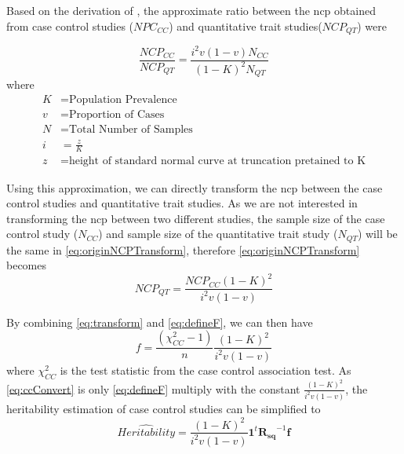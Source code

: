 			Based on the derivation of \citet{Yang2010}, the approximate ratio between the \gls{ncp} obtained from case control studies ($NPC_{CC}$) and quantitative trait studies($NCP_{QT}$) were
		
			\begin{equation}
			\frac{NCP_{CC}}{NCP_{QT}} = \frac{i^2v(1-v)N_{CC}}{(1-K)^2N_{QT}}
			\label{eq:originNCPTransform}
			\end{equation}
			where
			\begin{align*}
			 K &= \text{Population Prevalence} \\
			 v &= \text{Proportion of Cases}\\
			 N &= \text{Total Number of Samples}\\
			 i &= \frac{z}{K}\\
			 z &= \text{height of standard normal curve at truncation pretained to K}
			\end{align*}
			
			Using this approximation, we can directly transform the \gls{ncp} between the case control studies and quantitative trait studies.
			As we are not interested in transforming the \gls{ncp} between two different studies, the sample size of the case control study ($N_{CC}$) and sample size of the quantitative trait study ($N_{QT}$) will be the same in \cref{eq:originNCPTransform}, therefore \cref{eq:originNCPTransform} becomes
			\begin{equation}
			NCP_{QT} = \frac{NCP_{CC}(1-K)^2}{i^2v(1-v)}
			\label{eq:transform}
			\end{equation}
			
			By combining \cref{eq:transform} and \cref{eq:defineF}, we can then have
			\begin{equation}
			f = \frac{(\chi^2_{CC}-1)}{n}\frac{(1-K)^2}{i^2v(1-v)}
			\label{eq:ccConvert}
			\end{equation}
			where $\chi^2_{CC}$ is the test statistic from the case control association test.
			As \cref{eq:ccConvert} is only \cref{eq:defineF} multiply with the constant $\frac{(1-K)^2}{i^2v(1-v)}$, the heritability estimation of case control studies can be simplified to 
			\begin{equation}
			\hat{Heritability} =\frac{(1-K)^2}{i^2v(1-v)} \boldsymbol{1}^t\boldsymbol{R_{sq}}^{-1}\boldsymbol{f}
			\label{eq:caseControlHerit}
			\end{equation}
			
